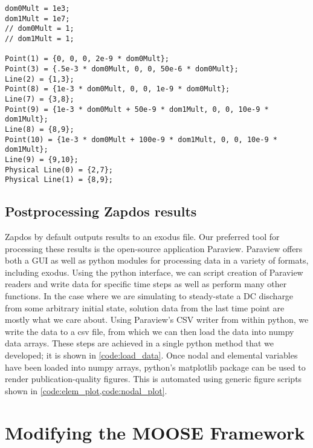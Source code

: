 \begin{lstlisting}[caption=Gmsh input file used to create plasma and liquid domains for simulations in \cref{sec:plasliq}, label=code:gmsh]
dom0Mult = 1e3;
dom1Mult = 1e7;
// dom0Mult = 1;
// dom1Mult = 1;

Point(1) = {0, 0, 0, 2e-9 * dom0Mult};
Point(3) = {.5e-3 * dom0Mult, 0, 0, 50e-6 * dom0Mult};
Line(2) = {1,3};
Point(8) = {1e-3 * dom0Mult, 0, 0, 1e-9 * dom0Mult};
Line(7) = {3,8};
Point(9) = {1e-3 * dom0Mult + 50e-9 * dom1Mult, 0, 0, 10e-9 * dom1Mult};
Line(8) = {8,9};
Point(10) = {1e-3 * dom0Mult + 100e-9 * dom1Mult, 0, 0, 10e-9 * dom1Mult};
Line(9) = {9,10};
Physical Line(0) = {2,7};
Physical Line(1) = {8,9};
\end{lstlisting}

\subsection{Postprocessing Zapdos results}
\label{sec:zap_post}

Zapdos by default outputs results to an exodus file. Our preferred tool for processing these results is the open-source application Paraview. \cite{paraview} Paraview offers both a GUI as well as python modules for processing data in a variety of formats, including exodus. Using the python interface, we can script creation of Paraview readers and write data for specific time steps as well as perform many other functions. In the case where we are simulating to steady-state a DC discharge from some arbitrary initial state, solution data from the last time point are mostly what we care about. Using Paraview's CSV writer from within python, we write the data to a csv file, from which we can then load the data into numpy data arrays. These steps are achieved in a single python method that we developed; it is shown in \cref{code:load_data}. Once nodal and elemental variables have been loaded into numpy arrays, python's matplotlib package can be used to render publication-quality figures. This is automated using generic figure scripts shown in \cref{code:elem_plot,code:nodal_plot}.


\section{Modifying the MOOSE Framework}
\label{sec:moose}

